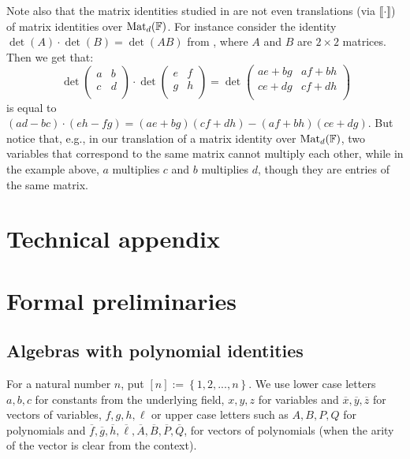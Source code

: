 \documentclass[12pt,reqno]{article}
\newcommand\F{\ensuremath{\mathbb F}}
\newcommand{\cd}{\cdot}
\newcommand{\matd}{{\ensuremath{{\rm Mat}_d(\F)}}}
\newcommand{\set}[1]{\left\{#1\right\}}
\begin{document}
Note also that the matrix identities studied in \cite{HT12} are not even translations (via $\llbracket \cd \rrbracket $) of matrix identities over \matd. For instance consider the identity $\det(A)\cd\det(B)=\det(AB)$ from \cite{HT12}, where $A$ and $B$ are $2\times 2$ matrices. Then we get that:
$$ \,
\det\begin{pmatrix}
a & b \\
c & d \\
\end{pmatrix}
\cd
\det\begin{pmatrix}
e & f \\
g & h \\
\end{pmatrix} =
\det\begin{pmatrix}
ae+bg & af+bh \\
ce+dg & cf+dh\\
\end{pmatrix}$$
is equal
to
$
(ad-bc)\cd(eh-fg)=(ae+bg)(cf+dh)-(af+bh)(ce+dg).
$
But notice that, e.g., in our translation of a  matrix identity over \matd, two variables that correspond to the same matrix cannot multiply each other, while in the example above, $a$ multiplies $c$ and $b$ multiplies $d$, though they are entries of the same matrix.








\newpage








\appendix
\section*{\huge Technical appendix}

\section{Formal preliminaries}
\subsection{Algebras with polynomial identities}
For a natural number $n$, put $[n]:=\set{1,2,...,n}$. We use lower case letters $a,b,c$ for constants from the underlying field, $x,y,z$ for variables and $\overline x,\overline y,\overline z$ for vectors of variables, $f,g,h,\ell$ or upper case letters such as $A,B,P,Q$ for polynomials and $\overline f,\overline g,\overline h,\overline \ell, \overline A,\overline B,\overline P, \overline Q$, for vectors of polynomials (when the arity of the vector is clear from the context).
\end{document}
